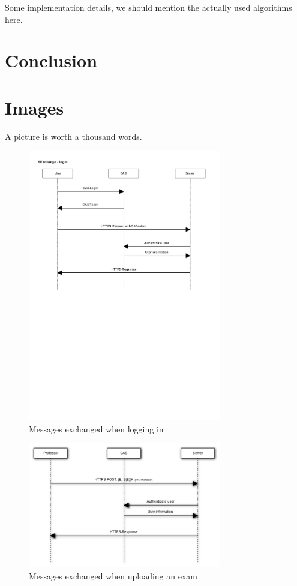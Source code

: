 \documentclass{article}
\begin{document}
Some implementation details, we should mention the actually used algorithms
here.

\section{Conclusion}

\section{Images}

A picture is worth a thousand words.

\begin{figure}
\begin{center}
\includegraphics[width=0.75\textwidth]{images/login.pdf}
\caption{Messages exchanged when logging in}
\label{fig:login}
\end{center}
\end{figure}

\begin{figure}
\begin{center}
\includegraphics[width=0.75\textwidth]{images/upload_exam.pdf}
\caption{Messages exchanged when uploading an exam}
\label{fig:upload)exam}
\end{center}
\end{figure}
\end{document}
